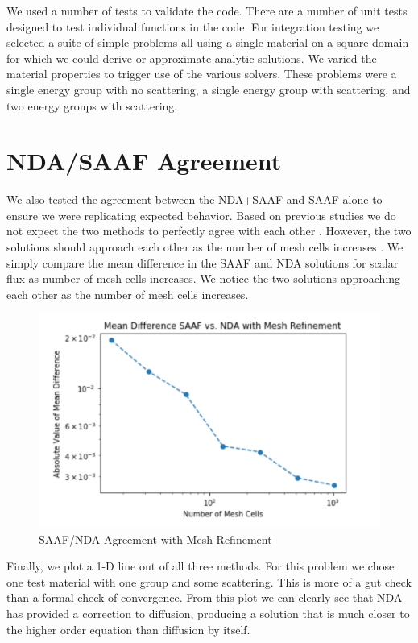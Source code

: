 We used a number of tests to validate the code. There are a number of unit tests designed to test individual functions in the code. For integration testing we selected a suite of simple problems all using a single material on a square domain for which we could derive or approximate analytic solutions. We varied the material properties to trigger use of the various solvers. These problems were a single energy group with no scattering, a single energy group with scattering, and two energy groups with scattering. 

\section{NDA/SAAF Agreement}
We also tested the agreement between the NDA+SAAF and SAAF alone to ensure we were replicating expected behavior. Based on previous studies we do not expect the two methods to perfectly agree with each other \cite{morel-holo}. However, the two solutions should approach each other as the number of mesh cells increases \cite{Wang2013}. We simply compare the mean difference in the SAAF and NDA solutions for scalar flux as number of mesh cells increases. We notice the two solutions approaching each other as the number of mesh cells increases. 
\begin{figure}[H]
    \centering
    \includegraphics[width=.75\textwidth]{fig/NDAvsSAAF.png}
    \caption{SAAF/NDA Agreement with Mesh Refinement}
    \label{fig:SAAFvsNDA}
\end{figure}



Finally, we plot a 1-D line out of all three methods. For this problem we chose one test material with one group and some scattering. This is more of a gut check than a formal check of convergence. From this plot we can clearly see that NDA has provided a correction to diffusion, producing a solution that is much closer to the higher order equation than diffusion by itself. 


